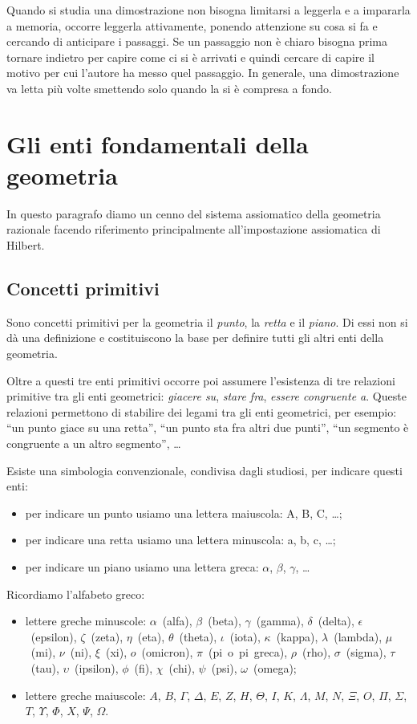 Quando si studia una dimostrazione non bisogna limitarsi a leggerla e a impararla a memoria, occorre leggerla attivamente, ponendo attenzione su cosa si fa e cercando di anticipare i passaggi. Se un passaggio non è chiaro bisogna prima tornare indietro per capire come ci si è arrivati e quindi cercare di capire il motivo per cui l'autore ha messo quel passaggio. In generale, una dimostrazione va letta più volte smettendo solo quando la si è compresa a fondo.

\section{Gli enti fondamentali della geometria}
In questo paragrafo diamo un cenno del sistema assiomatico della geometria razionale facendo riferimento principalmente all'impostazione assiomatica di Hilbert.

\subsection{Concetti primitivi}

Sono concetti primitivi per la geometria il \emph{punto}, la \emph{retta} e il \emph{piano}. Di essi non si dà una definizione e costituiscono la base per definire tutti gli altri enti della geometria.

Oltre a questi tre enti primitivi occorre poi assumere l'esistenza di tre relazioni primitive tra gli enti geometrici: \emph{giacere su}, \emph{stare fra}, \emph{essere congruente a}. Queste relazioni permettono di stabilire dei legami tra gli enti geometrici, per esempio: ``un punto giace su una retta'', ``un punto sta fra altri due punti'', ``un segmento è congruente a un altro segmento'', \ldots

Esiste una simbologia convenzionale, condivisa dagli studiosi, per indicare questi enti:
\begin{itemize}
\item per indicare un punto usiamo una lettera maiuscola: A, B, C, \ldots;
\item per indicare una retta usiamo una lettera minuscola: a, b, c, \ldots;
\item per indicare un piano usiamo una lettera greca: $\alpha$, $\beta$, $\gamma$, \ldots
\end{itemize}

Ricordiamo l'alfabeto greco:
\begin{itemize}
\item lettere greche minuscole:  $\alpha$~(alfa),  $\beta$~(beta),  $\gamma$~(gamma),  $\delta$~(delta), $\epsilon$~(epsilon), $\zeta$~(zeta), $\eta$~(eta), $\theta$~(theta),  $\iota$~(iota),  $\kappa$~(kappa), $\lambda$~(lambda), $\mu$~(mi), $\nu$~(ni),  $\xi$~(xi), $o$~(omicron), $\pi$~(pi~o~pi~greca), $\rho$~(rho), $\sigma$~(sigma), $\tau$~(tau), $\upsilon$~(ipsilon), $\phi$~(fi), $\chi$~(chi), $\psi$~(psi), $\omega$~(omega);
\item lettere greche maiuscole: $A$, $B$, $ \Gamma $, $ \Delta $, $ E $, $ Z $, $ H $, $ \Theta $, $ I $, $ K $, $ \Lambda $, $ M $, $ N $, $ \Xi $, $ O $, $ \Pi $, $ \Sigma $, $ T $, $ \Upsilon $, $ \Phi $, $ X $, $ \Psi $, $\Omega $.
\end{itemize}


